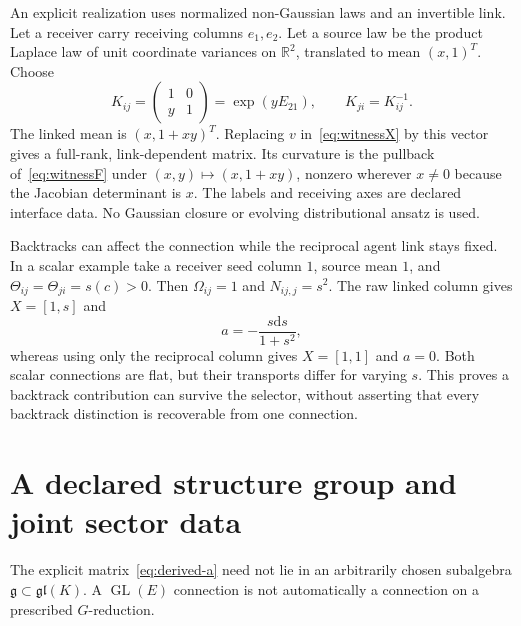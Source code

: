 \documentclass[11pt]{article}
\newcommand{\R}{\mathbb R}
\newcommand{\GL}{\operatorname{GL}}
\newcommand{\dd}{\mathrm d}
\begin{document}
An explicit realization uses normalized non-Gaussian laws and an invertible link. Let a receiver carry receiving columns $e_1,e_2$. Let a source law be the product Laplace law of unit coordinate variances on $\R^2$, translated to mean $(x,1)^T$. Choose
\begin{equation}
 K_{ij}=\begin{pmatrix}1&0\\y&1\end{pmatrix}
        =\exp(yE_{21}),\qquad K_{ji}=K_{ij}^{-1}.
\end{equation}
The linked mean is $(x,1+xy)^T$. Replacing $v$ in~\eqref{eq:witnessX} by this vector gives a full-rank, link-dependent matrix. Its curvature is the pullback of~\eqref{eq:witnessF} under $(x,y)\mapsto(x,1+xy)$, nonzero wherever $x\ne0$ because the Jacobian determinant is $x$. The labels and receiving axes are declared interface data. No Gaussian closure or evolving distributional ansatz is used.

Backtracks can affect the connection while the reciprocal agent link stays fixed. In a scalar example take a receiver seed column $1$, source mean $1$, and $\Theta_{ij}=\Theta_{ji}=s(c)>0$. Then $\Omega_{ij}=1$ and $N_{ij,j}=s^2$. The raw linked column gives $X=[1,s]$ and
\begin{equation}
 a=-\frac{s\dd s}{1+s^2},
\end{equation}
whereas using only the reciprocal column gives $X=[1,1]$ and $a=0$. Both scalar connections are flat, but their transports differ for varying $s$. This proves a backtrack contribution can survive the selector, without asserting that every backtrack distinction is recoverable from one connection.

\section{A declared structure group and joint sector data}
\label{sec:group}

The explicit matrix~\eqref{eq:derived-a} need not lie in an arbitrarily chosen subalgebra $\mathfrak g\subset\mathfrak{gl}(K)$. A $\GL(E)$ connection is not automatically a connection on a prescribed $G$-reduction.
\end{document}
